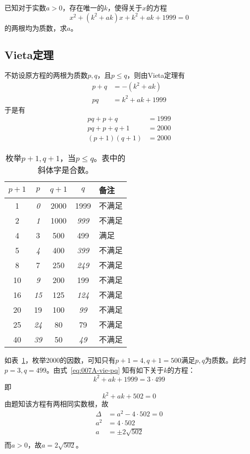 

已知对于实数$a > 0$，存在唯一的$k$，使得关于$x$的方程
\[ x^2 + (k^2 + ak)x + k^2 + ak + 1999 = 0 \]
的两根均为质数，求$a$。


\subsection{Vieta定理}

不妨设原方程的两根为质数$p, q$，且$p \le q$，则由Vieta定理有
\begin{align}
  p + q &= -(k^2 + ak) \\
  pq &= k^2 + ak + 1999 \label{eq:007A-vie-pq}
\end{align}
于是有
\begin{align*}
  pq + p + q &= 1999 \\
  pq + p + q + 1 &= 2000 \\
  (p + 1)(q + 1) &= 2000
\end{align*}

\begin{table}[htbp]
  \centering
  \begin{tabular}{ccccl}
    \toprule
    $p + 1$ & $p$ & $q + 1$ & $q$ & 备注 \\ \midrule
     1 & \emph{ 0} & 2000 &      1999  & 不满足 \\
     2 & \emph{ 1} & 1000 & \emph{999} & 不满足 \\
     4 &        3  &  500 &       499  & 满足 \\
     5 & \emph{ 4} &  400 & \emph{399} & 不满足 \\
     8 &        7  &  250 & \emph{249} & 不满足 \\
    10 & \emph{ 9} &  200 &       199  & 不满足 \\
    16 & \emph{15} &  125 & \emph{124} & 不满足 \\
    20 &       19  &  100 & \emph{ 99} & 不满足 \\
    25 & \emph{24} &   80 &        79  & 不满足 \\
    40 & \emph{39} &   50 & \emph{ 49} & 不满足 \\ \bottomrule
  \end{tabular}
  \caption{枚举$p + 1, q + 1$，当$p \le q$。表中的斜体字是合数。}
  \label{tab:007A-vie-enum}
\end{table}

如表~\ref{tab:007A-vie-enum}，枚举2000的因数，可知只有$p + 1 = 4, q + 1 = 500$满足$p, q$为质数。此时$p = 3, q = 499$。由式~\ref{eq:007A-vie-pq} 知有如下关于$k$的方程：
\[ k^2 + ak + 1999 = 3\cdot499 \]
即
\[ k^2 + ak + 502 = 0 \]
由题知该方程有两相同实数根，故
\begin{align*}
  \Delta &= a^2 - 4\cdot502 = 0 \\
  a^2 &= 4\cdot502 \\
  a &= \pm2\sqrt{502} \\
\end{align*}
而$a > 0$，故$a = 2\sqrt{502}$。
